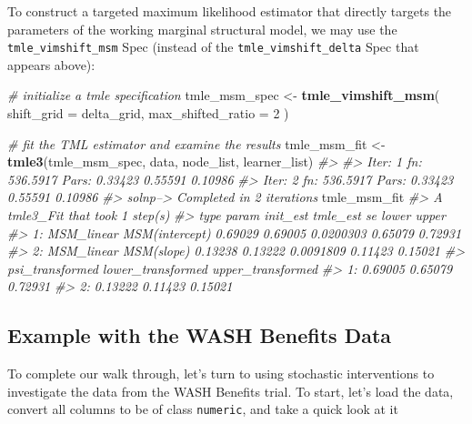 \documentclass[12pt, krantz2,]{book}
\newenvironment{Shaded}{\begin{snugshade}}{\end{snugshade}}
\newcommand{\CommentTok}[1]{\textcolor[rgb]{0.56,0.35,0.01}{\textit{#1}}}
\newcommand{\DataTypeTok}[1]{\textcolor[rgb]{0.13,0.29,0.53}{#1}}
\newcommand{\DecValTok}[1]{\textcolor[rgb]{0.00,0.00,0.81}{#1}}
\newcommand{\KeywordTok}[1]{\textcolor[rgb]{0.13,0.29,0.53}{\textbf{#1}}}
\newcommand{\NormalTok}[1]{#1}
\newcommand{\StringTok}[1]{\textcolor[rgb]{0.31,0.60,0.02}{#1}}
\theoremstyle{definition}
\theoremstyle{definition}
\theoremstyle{definition}
\newcommand{\1}{\mathbbm{1}}
\begin{document}
To construct a targeted maximum likelihood estimator that directly targets the
parameters of the working marginal structural model, we may use the
\texttt{tmle\_vimshift\_msm} Spec (instead of the \texttt{tmle\_vimshift\_delta} Spec that
appears above):

\begin{Shaded}
\begin{Highlighting}[]
\CommentTok{# initialize a tmle specification}
\NormalTok{tmle_msm_spec <-}\StringTok{ }\KeywordTok{tmle_vimshift_msm}\NormalTok{(}
  \DataTypeTok{shift_grid =}\NormalTok{ delta_grid,}
  \DataTypeTok{max_shifted_ratio =} \DecValTok{2}
\NormalTok{)}

\CommentTok{# fit the TML estimator and examine the results}
\NormalTok{tmle_msm_fit <-}\StringTok{ }\KeywordTok{tmle3}\NormalTok{(tmle_msm_spec, data, node_list, learner_list)}
\CommentTok{#> }
\CommentTok{#> Iter: 1 fn: 536.5917  Pars:  0.33423 0.55591 0.10986}
\CommentTok{#> Iter: 2 fn: 536.5917  Pars:  0.33423 0.55591 0.10986}
\CommentTok{#> solnp--> Completed in 2 iterations}
\NormalTok{tmle_msm_fit}
\CommentTok{#> A tmle3_Fit that took 1 step(s)}
\CommentTok{#>          type          param init_est tmle_est        se   lower   upper}
\CommentTok{#> 1: MSM_linear MSM(intercept)  0.69029  0.69005 0.0200303 0.65079 0.72931}
\CommentTok{#> 2: MSM_linear     MSM(slope)  0.13238  0.13222 0.0091809 0.11423 0.15021}
\CommentTok{#>    psi_transformed lower_transformed upper_transformed}
\CommentTok{#> 1:         0.69005           0.65079           0.72931}
\CommentTok{#> 2:         0.13222           0.11423           0.15021}
\end{Highlighting}
\end{Shaded}

\hypertarget{example-with-the-wash-benefits-data}{%
\subsection{Example with the WASH Benefits Data}\label{example-with-the-wash-benefits-data}}

To complete our walk through, let's turn to using stochastic interventions to
investigate the data from the WASH Benefits trial. To start, let's load the
data, convert all columns to be of class \texttt{numeric}, and take a quick look at it
\end{document}
